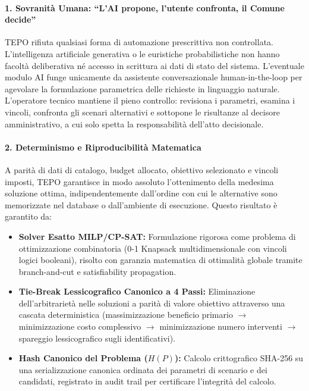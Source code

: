 \paragraph{1. Sovranità Umana: ``L'AI propone, l'utente confronta, il Comune decide''}
TEPO rifiuta qualsiasi forma di automazione prescrittiva non controllata. L'intelligenza artificiale generativa o le euristiche probabilistiche non hanno facoltà deliberativa né accesso in scrittura ai dati di stato del sistema. L'eventuale modulo AI funge unicamente da assistente conversazionale human-in-the-loop per agevolare la formulazione parametrica delle richieste in linguaggio naturale. L'operatore tecnico mantiene il pieno controllo: revisiona i parametri, esamina i vincoli, confronta gli scenari alternativi e sottopone le risultanze al decisore amministrativo, a cui solo spetta la responsabilità dell'atto decisionale.

\paragraph{2. Determinismo e Riproducibilità Matematica}
A parità di dati di catalogo, budget allocato, obiettivo selezionato e vincoli imposti, TEPO garantisce in modo assoluto l'ottenimento della medesima soluzione ottima, indipendentemente dall'ordine con cui le alternative sono memorizzate nel database o dall'ambiente di esecuzione. Questo risultato è garantito da:
\begin{itemize}[leftmargin=1.4em, itemsep=0.2em]
    \item \textbf{Solver Esatto MILP/CP-SAT:} Formulazione rigorosa come problema di ottimizzazione combinatoria (0-1 Knapsack multidimensionale con vincoli logici booleani), risolto con garanzia matematica di ottimalità globale tramite branch-and-cut e satisfiability propagation.
    \item \textbf{Tie-Break Lessicografico Canonico a 4 Passi:} Eliminazione dell'arbitrarietà nelle soluzioni a parità di valore obiettivo attraverso una cascata deterministica (massimizzazione beneficio primario $\to$ minimizzazione costo complessivo $\to$ minimizzazione numero interventi $\to$ spareggio lessicografico sugli identificativi).
    \item \textbf{Hash Canonico del Problema ($H(P)$):} Calcolo crittografico SHA-256 su una serializzazione canonica ordinata dei parametri di scenario e dei candidati, registrato in audit trail per certificare l'integrità del calcolo.
\end{itemize}

